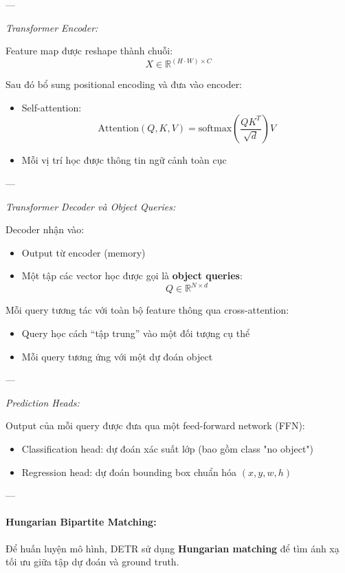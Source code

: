 ---

\textit{Transformer Encoder:}

Feature map được reshape thành chuỗi:
\[
X \in \mathbb{R}^{(H \cdot W) \times C}
\]

Sau đó bổ sung positional encoding và đưa vào encoder:

\begin{itemize}
	\item Self-attention:
	\[
	\text{Attention}(Q, K, V) = \text{softmax}\left(\frac{QK^T}{\sqrt{d}}\right)V
	\]
	\item Mỗi vị trí học được thông tin ngữ cảnh toàn cục
\end{itemize}

---

\textit{Transformer Decoder và Object Queries:}

Decoder nhận vào:
\begin{itemize}
	\item Output từ encoder (memory)
	\item Một tập các vector học được gọi là \textbf{object queries}:
	\[
	Q \in \mathbb{R}^{N \times d}
	\]
\end{itemize}

Mỗi query tương tác với toàn bộ feature thông qua cross-attention:
\begin{itemize}
	\item Query học cách “tập trung” vào một đối tượng cụ thể
	\item Mỗi query tương ứng với một dự đoán object
\end{itemize}

---

\textit{Prediction Heads:}

Output của mỗi query được đưa qua một feed-forward network (FFN):

\begin{itemize}
	\item Classification head: dự đoán xác suất lớp (bao gồm class "no object")
	\item Regression head: dự đoán bounding box chuẩn hóa $(x, y, w, h)$
\end{itemize}

---

\paragraph{Hungarian Bipartite Matching:}

Để huấn luyện mô hình, DETR sử dụng \textbf{Hungarian matching} để tìm ánh xạ tối ưu giữa tập dự đoán và ground truth.

